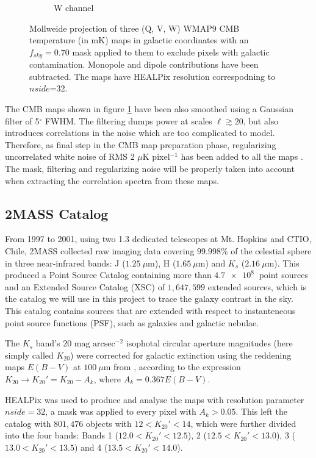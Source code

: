 \documentclass[openany,a4paper,12pt,oneside]{book}
\begin{document}
\begin{spacing}{1.5}
\begin{figure}[!htb]
\begin{subfigure}[b]{0.49\textwidth}
         \caption{W channel}
         \label{fig:Wchannel}
     \end{subfigure}
        \caption{Mollweide projection of three (Q, V, W) WMAP9 CMB temperature (in mK) maps in galactic coordinates with an $f_{sky}=0.70$ mask applied to them to exclude pixels with galactic contamination. Monopole and dipole contributions have been subtracted. The maps have HEALPix resolution correspodning to $nside$=32.}
        \label{fig:Wmap_maps}
\end{figure}

The CMB maps shown in figure \ref{fig:Wchannel} have been also smoothed using a Gaussian filter of 5$^\circ$ FWHM. The filtering dumps power at scales $\ell \gtrsim 20$, but also introduces correlations in the noise which are too complicated to model. Therefore, as final step in the CMB map preparation phase, regularizing uncorrelated white noise of RMS 2 $\mu$K pixel$^{-1}$ has been added to all the maps \cite{Moura-Santos_2016}. The mask, filtering and regularizing noise will be properly taken into account when extracting the correlation spectra from these maps.


\subsection{2MASS Catalog}

From 1997 to 2001, using two 1.3 dedicated telescopes at Mt. Hopkins and CTIO, Chile, 2MASS collected raw imaging data covering $99.998\%$ of the celestial sphere in three near-infrared bands: J ($\SI{1.25}{\mu \meter}$), H ($\SI{1.65}{\mu \meter}$) and $K_s$ ($\SI{2.16}{\mu \meter}$). This produced a Point Source Catalog containing more than $\SI{4.7e8}{}$ point sources and an Extended Source Catalog (XSC) of $1,647,599$ extended sources, which is the catalog we will use in this project to trace the galaxy contrast in the sky. This catalog contains sources that are extended with respect to instanteneous point source functions (PSF), such as galaxies and galactic nebulae.

The $K_s$ band's $20 \text{ mag arcsec}^{-2}$ isophotal circular aperture magnitudes (here simply called $K_{20}$) were corrected for galactic extinction using the reddening maps $E(B-V)$ at $\SI{100}{\mu \meter}$ from \cite{Schlegel_1998}, according to the expression $K_{20} \rightarrow K_{20}'=K_{20}-A_k$, where $A_k=0.367E(B-V)$.

HEALPix was used to produce and analyse the maps with resolution parameter $nside=32$, a mask was applied to every pixel with $A_k>0.05$. This left the catalog with $801,476$ objects with $12<K_{20}'<14$, which were further divided into the four bands: Bands 1 ($12.0<K_{20}'<12.5$), 2 ($12.5<K_{20}'<13.0$), 3 ($13.0<K_{20}'<13.5$) and 4 ($13.5<K_{20}'<14.0$). 


\end{spacing}
\end{document}
